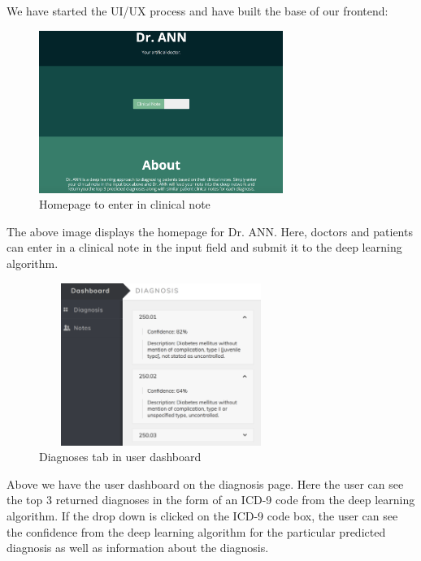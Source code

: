 \documentclass{article}
\begin{document}
We have started the UI/UX process and have built the base of our frontend: 

\begin{figure}[H]
\begin{center}
\includegraphics[width=300px,height=200px]{input.png}
\caption{Homepage to enter in clinical note}
\end{center}
\end{figure}

\noindent The above image displays the homepage for Dr. ANN. Here, doctors and patients can enter in a clinical note in the input field and submit it to the deep learning algorithm. 

\begin{figure}[H]
\begin{center}
\includegraphics[width=300px, height=200px]{diagnosis.png}
\caption{Diagnoses tab in user dashboard}
\end{center}
\end{figure}

\noindent Above we have the user dashboard on the diagnosis page. Here the user can see the top 3 returned diagnoses in the form of an ICD-9 code from the deep learning algorithm.  If the drop down is clicked on the ICD-9 code box, the user can see the confidence from the deep learning algorithm for the particular predicted diagnosis as well as information about the diagnosis. 
\end{document}
